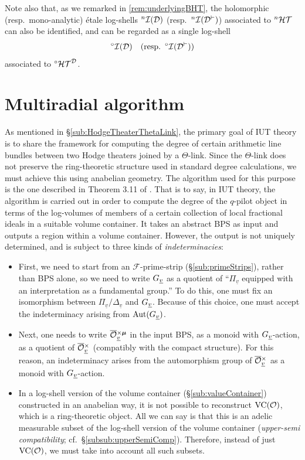 \documentclass[12pt, reqno, a4paper]{amsart}
\def\udl#1{\underline{#1}} %
\def\cD{{\mathcal{D}}}
\def\cF{{\mathcal{F}}}
\def\uv{\udl{v}} %
\DeclareMathOperator{\Aut}{Aut}
\DeclareMathOperator{\VC}{VC}
\DeclareMathOperator{\Ind}{Ind}
\begin{document}
\medskip
Note also that, as we remarked in \ref{rem:underlyingBHT}, the holomorphic (resp.\ mono-analytic) \'etale log-shells $\LS[n](\cD)$ (resp.\ $\LS[n](\cDv)$) associated to $\HT[n]$ can also be identified, and can be regarded as a single log-shell
$$
\LS[\circ](\cD)\quad\text{(resp.}\ \LS[\circ](\cDv))
$$
associated to $\HT[\circ]^{\cD}$.


\setcounter{equation}{0}
\section{Multiradial algorithm}\label{sec:multiradialThetaCor312}
As mentioned in \S\ref{sub:HodgeTheaterThetaLink}, the primary goal of IUT theory is to share the framework for computing the degree of certain arithmetic line bundles between two Hodge theaters joined by a $\Theta$-link. Since the $\Theta$-link does not preserve the ring-theoretic structure used in standard degree calculations, we must achieve this using anabelian geometry. The algorithm used for this purpose is the one described in Theorem 3.11 of \cite{MR4225475}. That is to say, in IUT theory, the algorithm is carried out in order to compute the degree of the $q$-pilot object in terms of the log-volumes of members of a certain collection of local fractional ideals in a suitable volume container.  It takes an abstract BPS as input and outputs a region within a volume container. However, the output is not uniquely determined, and is subject to three kinds of \textit{indeterminacies}:

\begin{itemize}
\item[($\Ind_1$)] First, we need to start from an $\cF$-prime-strip (\S\ref{sub:primeStrips}), rather than BPS alone, so we need to write $\GG_{\uv}$ as a quotient of ``$\Pi_{\uv}$ equipped with an interpretation as a fundamental group.''  To do this, one must fix an isomorphism between $\Pi_{\uv}/\Delta_{\uv}$ and $\GG_{\uv}$.  Because of this choice, one must accept the indeterminacy arising from $\Aut(\GG_{\uv})$.
\item[($\Ind_2$)] Next, one needs to write $\oOOxmu_{\uv}$ in the input BPS, as a monoid with $\GG_{\uv}$-action, as a quotient of $\oOOx_{\uv}$ (compatibly with the compact structure).  For this reason, an indeterminacy arises from the automorphism group of $\oOOx_{\uv}$ as a monoid with $\GG_{\uv}$-action.
\item[($\Ind_3$)] In a log-shell version of the volume container (\S\ref{sub:valueContainer}) constructed in an anabelian way, it is not possible to reconstruct $\VC(\OO)$, which is a ring-theoretic object. All we can say is that this is an adelic measurable subset of the log-shell version of the volume container ({\it upper-semi compatibility}; cf.\ \S\ref{subsub:upperSemiComp}). Therefore, instead of just $\VC(\OO)$, we must take into account all such subsets.
\end{itemize}
\end{document}
